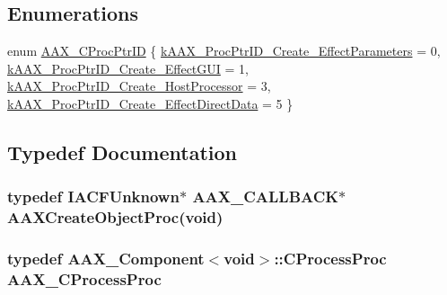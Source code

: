 \subsection*{Enumerations}
\begin{DoxyCompactItemize}
\item 
enum \hyperlink{a00163_af0682195d377392ad356fd2b00c36892}{A\+A\+X\+\_\+\+C\+Proc\+Ptr\+I\+D} \{ \hyperlink{a00163_af0682195d377392ad356fd2b00c36892a86aab4af036f1087b4f31bbac234ac3d}{k\+A\+A\+X\+\_\+\+Proc\+Ptr\+I\+D\+\_\+\+Create\+\_\+\+Effect\+Parameters} = 0, 
\hyperlink{a00163_af0682195d377392ad356fd2b00c36892a102df0cf99f7423a7997dd283eed7a88}{k\+A\+A\+X\+\_\+\+Proc\+Ptr\+I\+D\+\_\+\+Create\+\_\+\+Effect\+G\+U\+I} = 1, 
\hyperlink{a00163_af0682195d377392ad356fd2b00c36892a04ce687ba05b8c7c2cce0b32d868f3db}{k\+A\+A\+X\+\_\+\+Proc\+Ptr\+I\+D\+\_\+\+Create\+\_\+\+Host\+Processor} = 3, 
\hyperlink{a00163_af0682195d377392ad356fd2b00c36892a2d3621474e9eeeda84309dad0a4d8d8e}{k\+A\+A\+X\+\_\+\+Proc\+Ptr\+I\+D\+\_\+\+Create\+\_\+\+Effect\+Direct\+Data} = 5
 \}
\end{DoxyCompactItemize}


\subsection{Typedef Documentation}
\hypertarget{a00163_ad02e57363d002e60ca822c728896a3c4}{}
\subsubsection[{A\+A\+X\+Create\+Object\+Proc}]{\setlength{\rightskip}{0pt plus 5cm}typedef {\bf I\+A\+C\+F\+Unknown}$\ast$ {\bf A\+A\+X\+\_\+\+C\+A\+L\+L\+B\+A\+C\+K}$\ast$ A\+A\+X\+Create\+Object\+Proc(void)}\label{a00163_ad02e57363d002e60ca822c728896a3c4}
\hypertarget{a00163_ad6dd5e1aa5bd2f8462966685e3b26a6e}{}
\subsubsection[{A\+A\+X\+\_\+\+C\+Process\+Proc}]{\setlength{\rightskip}{0pt plus 5cm}typedef {\bf A\+A\+X\+\_\+\+Component}$<$void$>$\+::C\+Process\+Proc {\bf A\+A\+X\+\_\+\+C\+Process\+Proc}}\label{a00163_ad6dd5e1aa5bd2f8462966685e3b26a6e}


